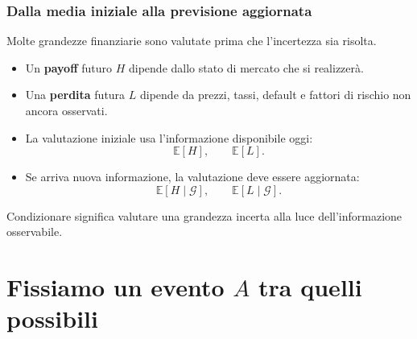 \documentclass[handout]{beamer}%
\newenvironment{stepitemize}{\begin{itemize}[<+->]}{\end{itemize} }
\providecommand{\E}{\mathbb{E}}
\providecommand{\G}{\mathcal{G}}
\providecommand{\1}{\mathbf{1}}
\providecommand{\QTR}[2]{\csname #1\endcsname{#2}}
\begin{document}
\begin{frame}%
%

\frametitle{Dalla media iniziale alla previsione aggiornata}%
%

%


Molte grandezze finanziarie sono valutate prima che l'incertezza sia risolta.

\medskip

\begin{stepitemize}


\item Un \textbf{payoff} futuro $H$ dipende dallo stato di mercato che si realizzer\`{a}.

\item Una \textbf{perdita} futura $L$ dipende da prezzi, tassi, default e
fattori di rischio non ancora osservati.

\item La valutazione iniziale usa l'informazione disponibile oggi:
\[
\E[H], \qquad\E[L].
\]


\item Se arriva nuova informazione, la valutazione deve essere aggiornata:
\[
\E[H\mid \G], \qquad\E[L\mid \G].
\]

\end{stepitemize}

\medskip

\begin{center}
{\small Condizionare significa valutare una grandezza incerta alla luce
dell'informazione osservabile.}
\end{center}%

\transboxout
\end{frame}%


\section{Fissiamo un evento \texorpdfstring{$A$}{A} tra quelli possibili}%
\end{document}
